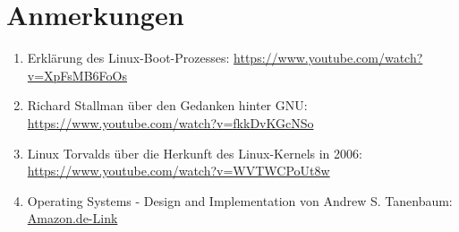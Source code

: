 \documentclass{dcbl/challenge}
\begin{document}
\section*{Anmerkungen}
\begin{enumerate}
    \item Erklärung des Linux-Boot-Prozesses: \url{https://www.youtube.com/watch?v=XpFsMB6FoOs}
    \item Richard Stallman über den Gedanken hinter GNU: \url{https://www.youtube.com/watch?v=fkkDvKGcNSo}
    \item Linux Torvalds über die Herkunft des Linux-Kernels in 2006: \url{https://www.youtube.com/watch?v=WVTWCPoUt8w}
    \item Operating Systems - Design and Implementation von Andrew S. Tanenbaum: \href{https://www.amazon.de/Operating-Systems-Implementation-Prentice-Software/dp/0131429388/ref=sr_1_5?__mk_de_DE=%C3%85M%C3%85%C5%BD%C3%95%C3%91&crid=16U05ITYOD3T0&dib=eyJ2IjoiMSJ9.zEJWJZxks-8Bv2rfn7oxBNyDxTQG9MEN_jtz2LyrZ_J1VBsopfBd0__hGtFXy7PfL0Nu-Q1BpEJjRJiDZ8UBAw.-4bon1aukJZLWOPS_Hp8s59FmIKHRqAMwPH752Hx9V8&dib_tag=se&keywords=minix+buch&qid=1712681247&sprefix=minix+buch%2Caps%2C133&sr=8-5}{Amazon.de-Link}
\end{enumerate}
\end{document}
